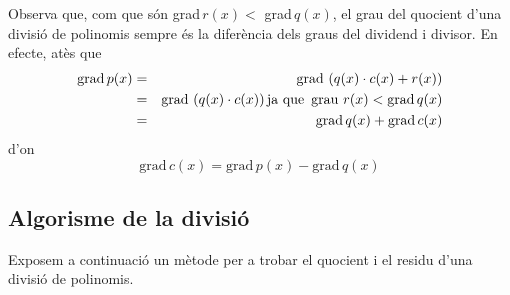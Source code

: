 Observa que, com que són grad\,$r(x)<$ grad\,$q(x)$, el grau del
quocient d’una divisió de polinomis sempre és la diferència
dels graus del dividend i divisor. En efecte, atès que
\begin{eqnarray*}
\text{grad\,}p(x) &=&\text{grad\,}\left( q(x)\cdot c(x)+r(x)\right) \\
&=&\text{grad\,}\left( q(x)\cdot c(x)\right) \text{ja que }\operatorname{grau}\,r(x)<\text{grad}\,q(x) \\
&=&\text{grad}\,q(x)+\text{grad}\,c(x)
\end{eqnarray*}d'on\begin{equation*}
\text{grad}\,c(x)=\text{grad}\,p(x)-\text{grad}\,q(x)
\end{equation*}

\subsection{Algorisme de la divisió}

Exposem a continuació un mètode per a trobar el quocient i el
residu d’una divisió de polinomis.

